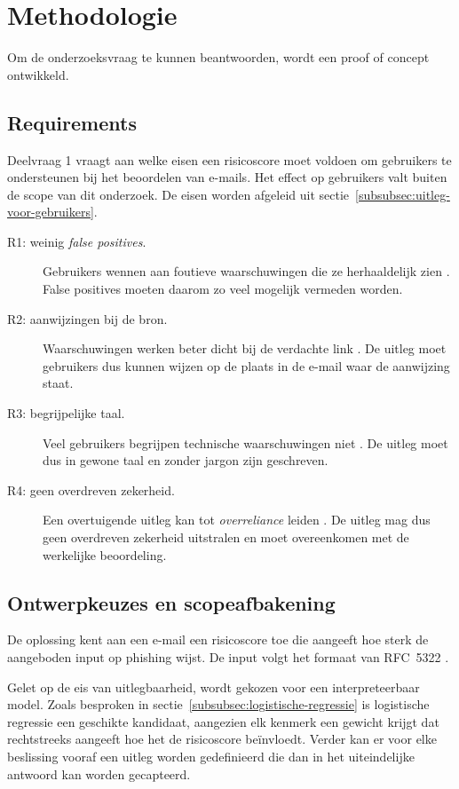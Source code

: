\section{Methodologie}
\label{sec:methodologie}

Om de onderzoeksvraag te kunnen beantwoorden, wordt een proof of concept ontwikkeld.

\subsection{Requirements}
\label{subsec:requirements}
Deelvraag 1 vraagt aan welke eisen een risicoscore moet voldoen om gebruikers te ondersteunen bij het beoordelen van e-mails. Het effect op gebruikers valt buiten de scope van dit onderzoek. De eisen worden afgeleid uit sectie~\ref{subsubsec:uitleg-voor-gebruikers}.

\begin{description}
  \item[R1: weinig \emph{false positives}.] Gebruikers wennen aan foutieve waarschuwingen die ze herhaaldelijk zien \autocite{Anderson2015}. False positives moeten daarom zo veel mogelijk vermeden worden.
  \item[R2: aanwijzingen bij de bron.] Waarschuwingen werken beter dicht bij de verdachte link \autocite{Petelka2019}. De uitleg moet gebruikers dus kunnen wijzen op de plaats in de e-mail waar de aanwijzing staat.
  \item[R3: begrijpelijke taal.] Veel gebruikers begrijpen technische waarschuwingen niet \autocite{Egelman2008}. De uitleg moet dus in gewone taal en zonder jargon zijn geschreven.
  \item[R4: geen overdreven zekerheid.] Een overtuigende uitleg kan tot \emph{overreliance} leiden \autocite{Bucinca2021}. De uitleg mag dus geen overdreven zekerheid uitstralen en moet overeenkomen met de werkelijke beoordeling.
\end{description}

\subsection{Ontwerpkeuzes en scopeafbakening}
\label{subsec:afbakening-scope}
De oplossing kent aan een e-mail een risicoscore toe die aangeeft hoe sterk de aangeboden input op phishing wijst. De input volgt het formaat van RFC~5322 \autocite{Resnick2008}.

Gelet op de eis van uitlegbaarheid, wordt gekozen voor een interpreteerbaar model. Zoals besproken in sectie~\ref{subsubsec:logistische-regressie} is logistische regressie een geschikte kandidaat, aangezien elk kenmerk een gewicht krijgt dat rechtstreeks aangeeft hoe het de risicoscore beïnvloedt. Verder kan er voor elke beslissing vooraf een uitleg worden gedefinieerd die dan in het uiteindelijke antwoord kan worden gecapteerd.

